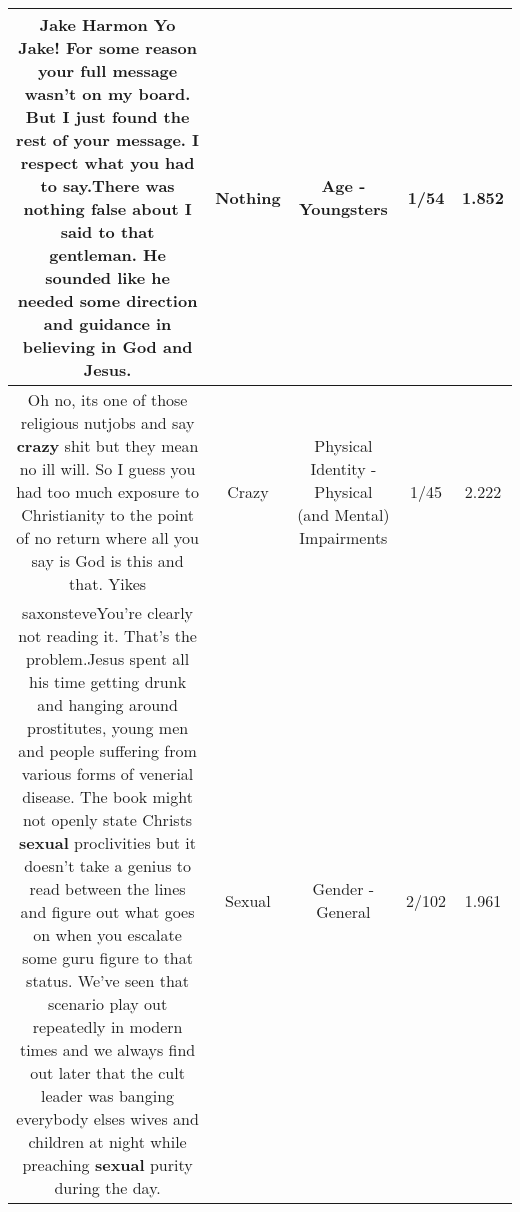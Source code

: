 \documentclass[11pt]{article}
\newlength\mylength
\begin{document}
\begin{center}
\begin{longtable}{|C{.65\mylength}|C{.30\mylength}|C{.12\mylength}|C{.12\mylength}|C{.12\mylength}|}
  \small Jake Harmon Yo Jake! For some reason your full message wasn't on my board. But I just found the rest of your message. I respect what you had to say.There was \textbf{nothing} false about I said to that gentleman. He sounded like he needed some direction and guidance in believing in God and Jesus.\normalsize   & Nothing & Age - Youngsters & 1/54 & 1.852 \\  \hline
  \small Oh no, its one of those religious nutjobs and say \textbf{crazy} shit but they mean no ill will. So I guess you had too much exposure to Christianity to the point of no return where all you say is God is this and that. Yikes\normalsize   & Crazy & Physical Identity - Physical (and Mental) Impairments & 1/45 & 2.222 \\  \hline
  \small saxonsteveYou're clearly not reading it. That's the problem.Jesus spent all his time getting drunk and hanging around prostitutes, young men and people suffering from various forms of venerial disease. The book might not openly state Christs \textbf{sexual} proclivities but it doesn't take a genius to read between the lines and figure out what goes on when you escalate some guru figure to that status. We've seen that scenario play out repeatedly in modern times and we always find out later that the cult leader was banging everybody elses wives and children at night while preaching \textbf{sexual} purity during the day.\normalsize   & Sexual & Gender - General & 2/102 & 1.961 \\  \hline

\end{longtable}
\end{center}
\end{document}
